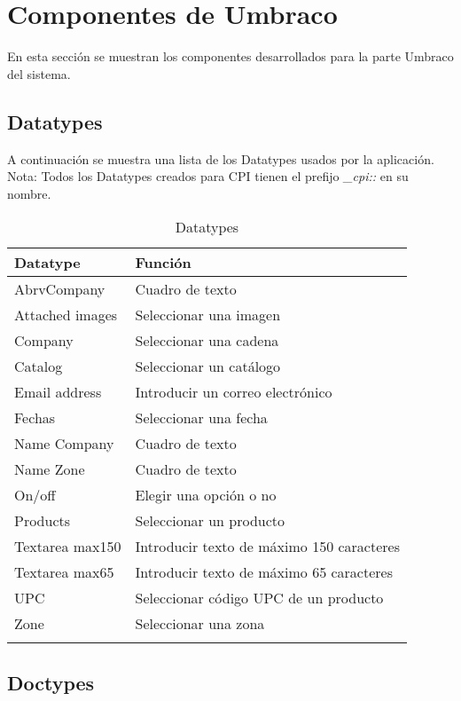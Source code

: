 \vskip 2cm
\section{Componentes de Umbraco} \label{componentesUmbraco}
En esta sección se muestran los componentes desarrollados para la parte Umbraco del sistema.

\subsection{Datatypes}
A continuación se muestra una lista de los Datatypes usados por la aplicación.
Nota: Todos los Datatypes creados para CPI tienen el prefijo \emph{\_cpi::} en su nombre.

\begin{longtable}{  l | l  }
    \hline\hline
    \rowcolor{blue!25}
    \textbf{Datatype} & \textbf{Función} \\
    \hline\hline
    \endhead
 
    \hline
    \endfoot
 
    \endlastfoot
 
    AbrvCompany & Cuadro de texto \\
    Attached images & Seleccionar una imagen \\
    Company & Seleccionar una cadena \\
    Catalog & Seleccionar un catálogo \\
    Email address & Introducir un correo electrónico \\
    Fechas & Seleccionar una fecha \\
    Name Company & Cuadro de texto \\
    Name Zone & Cuadro de texto \\
    On/off & Elegir una opción o no \\
    Products & Seleccionar un producto \\
    Textarea max150 & Introducir texto de máximo 150 caracteres \\
    Textarea max65 & Introducir texto de máximo 65 caracteres \\
    UPC & Seleccionar código UPC de un producto \\
    Zone  & Seleccionar una zona \\
    \hline
 
    \caption{Datatypes}
    \label{table:datatypes}
 \end{longtable}


\subsection{Doctypes}



